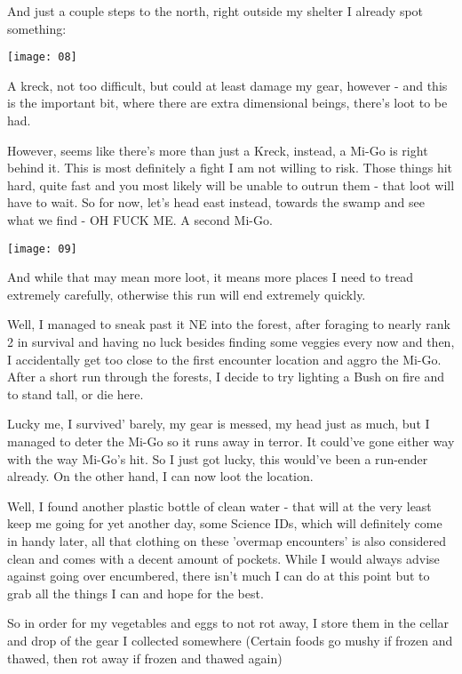 And just a couple steps to the north, right outside my shelter I already spot something:

\begin{center}
    \texttt{[image: 08]}
\end{center}

A kreck, not too difficult, but could at least damage my gear, however - and this is the important bit, where there are extra dimensional beings, there's loot to be had.

However, seems like there's more than just a Kreck, instead, a Mi-Go is right behind it. This is most definitely a fight I am not willing to risk. Those things hit hard, quite fast and you most likely will be unable to outrun them - that loot will have to wait.
So for now, let's head east instead, towards the swamp and see what we find - OH FUCK ME. A second Mi-Go.

\begin{center}
    \texttt{[image: 09]}
\end{center}

And while that may mean more loot, it means more places I need to tread extremely carefully, otherwise this run will end extremely quickly.

Well, I managed to sneak past it NE into the forest, after foraging to nearly rank 2 in survival and having no luck besides finding some veggies every now and then, I accidentally get too close to the first encounter location and aggro the Mi-Go. After a short run through the forests, I decide to try lighting a Bush on fire and to stand tall, or die here.

Lucky me, I survived' barely, my gear is messed, my head just as much, but I managed to deter the Mi-Go so it runs away in terror. It could've gone either way with the way Mi-Go's hit. So I just got lucky, this would've been a run-ender already. On the other hand, I can now loot the location.

Well, I found another plastic bottle of clean water - that will at the very least keep me going for yet another day, some Science IDs, which will definitely come in handy later, all that clothing on these 'overmap encounters' is also considered clean and comes with a decent amount of pockets. While I would always advise against going over encumbered, there isn't much I can do at this point but to grab all the things I can and hope for the best.

So in order for my vegetables and eggs to not rot away, I store them in the cellar and drop of the gear I collected somewhere (Certain foods go mushy if frozen and thawed, then rot away if frozen and thawed again)

